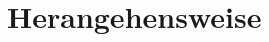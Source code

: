 







\begingroup
\parskip=0pt
\tableofcontents
\endgroup

\clearpage


\clearpage
\section{Herangehensweise}
%
%


\clearpage

%

\clearpage


%
%
%

